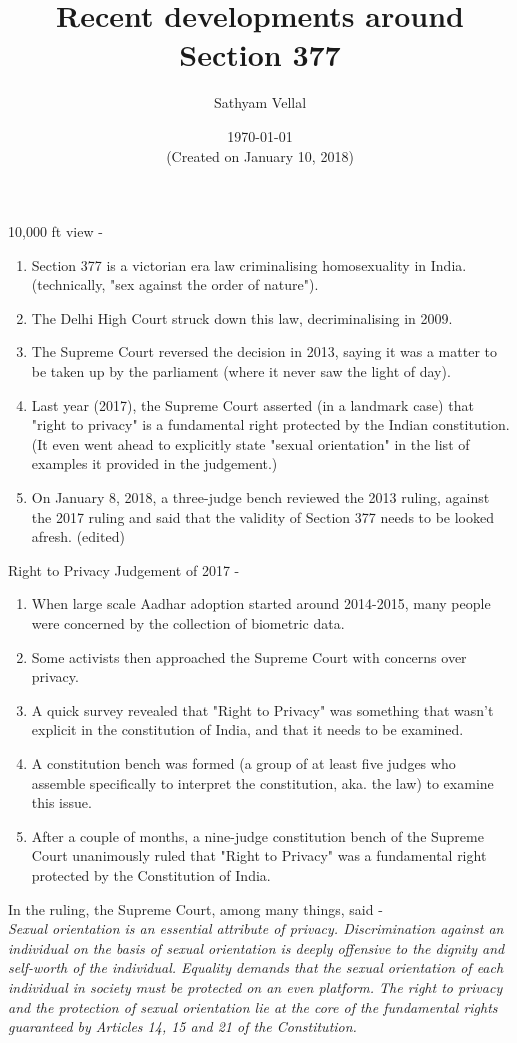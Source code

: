 \documentclass[11pt]{article}
\title{Recent developments around Section 377}
\author{Sathyam Vellal}
\date{\today\\(\footnotesize Created on January 10, 2018)}
\begin{document}
\maketitle

10,000 ft view -
\begin{enumerate}[noitemsep]
	\item Section 377 is a victorian era law criminalising homosexuality in India. (technically, "sex against the order of nature"). 
	\item The Delhi High Court struck down this law, decriminalising in 2009.
	\item The Supreme Court reversed the decision in 2013, saying it was a matter to be taken up by the parliament (where it never saw the light of day).
	\item Last year (2017), the Supreme Court asserted (in a landmark case) that "right to privacy" is a fundamental right protected by the Indian constitution. (It even went ahead to explicitly state "sexual orientation" in the list of examples it provided in the judgement.)
	\item On January 8, 2018, a three-judge bench reviewed the 2013 ruling, against the 2017 ruling and said that the validity of Section 377 needs to be looked afresh. (edited)
\end{enumerate}

Right to Privacy Judgement of 2017 - 
\begin{enumerate}[noitemsep]
	\item When large scale Aadhar adoption started around 2014-2015, many people were concerned by the collection of biometric data. 
	\item Some activists then approached the Supreme Court with concerns over privacy.
	\item A quick survey revealed that "Right to Privacy" was something that wasn't explicit in the constitution of India, and that it needs to be examined.
	\item A constitution bench was formed (a group of at least five judges who assemble specifically to interpret the constitution, aka. the law) to examine this issue.
	\item After a couple of months, a nine-judge constitution bench of the Supreme Court unanimously ruled that "Right to Privacy" was a fundamental right protected by the Constitution of India.
\end{enumerate}

In the ruling, the Supreme Court, among many things, said -\\
{\itshape Sexual orientation is an essential attribute of privacy. Discrimination against an individual on the basis of sexual orientation is deeply offensive to the dignity and self-worth of the individual. Equality demands that the sexual orientation of each individual in society must be protected on an even platform. The right to privacy and the protection of sexual orientation lie at the core of the fundamental rights guaranteed by Articles 14, 15 and 21 of the Constitution.}
\end{document}
